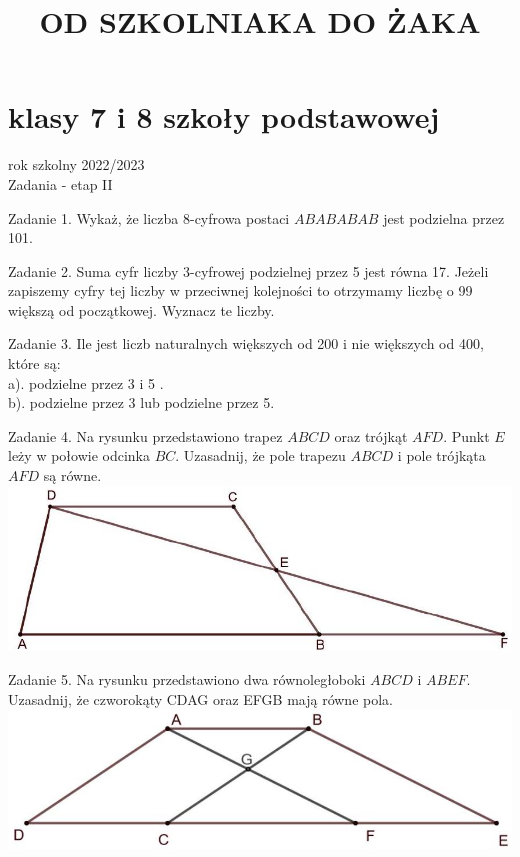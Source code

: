 \documentclass[10pt]{article}
\title{OD SZKOLNIAKA DO ŻAKA }
\author{}
\date{}
\begin{document}
\maketitle
\section*{klasy 7 i 8 szkoły podstawowej}
rok szkolny 2022/2023\\
Zadania - etap II

Zadanie 1. Wykaż, że liczba 8-cyfrowa postaci \(A B A B A B A B\) jest podzielna przez 101.

Zadanie 2. Suma cyfr liczby 3-cyfrowej podzielnej przez 5 jest równa 17. Jeżeli zapiszemy cyfry tej liczby w przeciwnej kolejności to otrzymamy liczbę o 99 większą od początkowej. Wyznacz te liczby.

Zadanie 3. Ile jest liczb naturalnych większych od 200 i nie większych od 400, które są:\\
a). podzielne przez 3 i 5 .\\
b). podzielne przez 3 lub podzielne przez 5.

Zadanie 4. Na rysunku przedstawiono trapez \(A B C D\) oraz trójkąt \(A F D\). Punkt \(E\) leży w połowie odcinka \(B C\). Uzasadnij, że pole trapezu \(A B C D\) i pole trójkąta \(A F D\) są równe.\\
\includegraphics[max width=\textwidth, center]{2024_11_21_7fff4e7075cc1bd990c9g-1}

Zadanie 5. Na rysunku przedstawiono dwa równoległoboki \(A B C D\) i \(A B E F\). Uzasadnij, że czworokąty CDAG oraz EFGB mają równe pola.\\
\includegraphics[max width=\textwidth, center]{2024_11_21_7fff4e7075cc1bd990c9g-1(1)}
\end{document}
